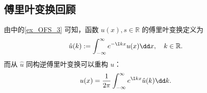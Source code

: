 

\subsection{傅里叶变换回顾}
由中的\autoref{ex_OFS_3} 可知，函数 $u(x),s\in\mathbb R$ 的傅里叶变换定义为
\begin{equation}
\hat u(k):=\int_{-\infty}^{\infty} e^{-\I kx}u(x)\dd x,\quad k\in\mathbb R.~
\end{equation}
而从 $\hat u$ 同构逆傅里叶变换可以重构 $u$：
\begin{equation}
u(x)=\frac{1}{2\pi}\int_{-\infty}^{\infty} e^{\I kx}\hat u(k)\dd k.~
\end{equation}























